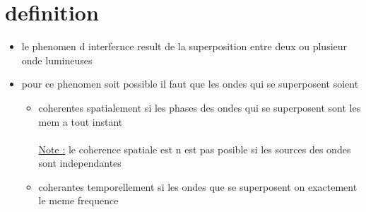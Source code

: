 \documentclass[12pt]{book}
\begin{document}
        \section{definition}
            \begin{itemize}
                \item le phenomen d interfernce result de la superposition entre deux ou plusieur onde lumineuses
                \item pour ce phenomen soit possible il faut que les ondes qui se superposent soient
                    \begin{itemize}
                        \item coherentes spatialement
                            si les phases des ondes qui se superposent sont les mem a tout instant \\
                            \\ \underline{Note :} le coherence spatiale est n est pas posible si les sources des ondes sont independantes
                        \item coherantes temporellement
                            si les ondes que se superposent on exactement le meme frequence
                \end{itemize}
            \end{itemize}
\end{document}
